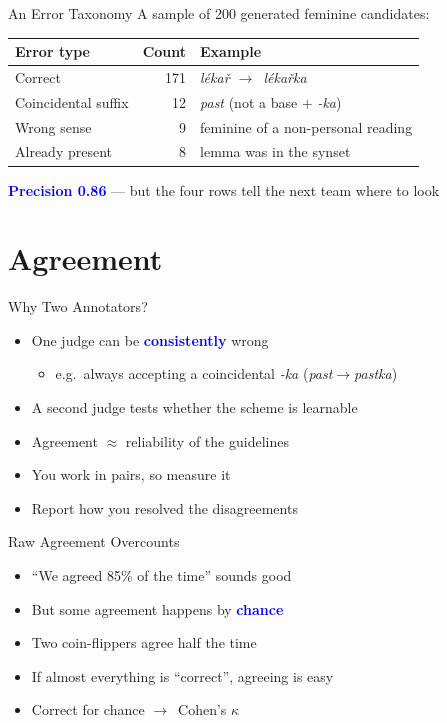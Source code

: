 \documentclass[xetex,aspectratio=169]{beamer}
\newcommand{\txx}[1]{\textbf{\textcolor{blue}{#1}}}
\newcommand{\into}{\ensuremath{\rightarrow}\xspace}
\begin{document}
\begin{frame}{An Error Taxonomy}
  A sample of 200 generated feminine candidates:
  \begin{center}
  \begin{tabular}{lrl}
    \toprule
    Error type & Count & Example \\
    \midrule
    Correct                 & 171 & \textit{l\'eka\v{r} \into\ l\'eka\v{r}ka} \\
    Coincidental suffix     &  12 & \textit{past} (not a base $+$ \textit{-ka}) \\
    Wrong sense             &   9 & feminine of a non-personal reading \\
    Already present         &   8 & lemma was in the synset \\
    \bottomrule
  \end{tabular}
  \end{center}
  \bigskip
  \txx{Precision 0.86} --- but the four rows tell the next team where to look
\end{frame}

\section{Agreement}

\begin{frame}{Why Two Annotators?}
  \begin{itemize}
  \item One judge can be \txx{consistently} wrong
    \begin{itemize}
    \item e.g.\ always accepting a coincidental \textit{-ka} (\textit{past}\into\textit{pastka})
    \end{itemize}
  \item A second judge tests whether the scheme is learnable
  \item Agreement $\approx$ reliability of the guidelines
  \item You work in pairs, so measure it
  \item Report how you resolved the disagreements
  \end{itemize}
\end{frame}

\begin{frame}{Raw Agreement Overcounts}
  \begin{itemize}
  \item ``We agreed 85\% of the time'' sounds good
  \item But some agreement happens by \txx{chance}
  \item Two coin-flippers agree half the time
  \item If almost everything is ``correct'', agreeing is easy
  \item Correct for chance \into\ Cohen's $\kappa$
  \end{itemize}
\end{frame}
\end{document}
